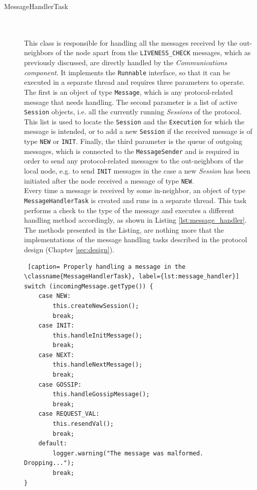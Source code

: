 \documentclass[a4paper,11pt,twoside]{report}
\newcommand{\classname}[1]{\texttt{#1}}
\begin{document}
\begin{description}
\item[MessageHandlerTask] \hfill \\\\
This class is responsible for handling all the messages received by the out-neighbors of the node  apart from the \classname{LIVENESS\_CHECK} messages, which as previously discussed, are directly handled by the \textit{Communications component}. It implements the \classname{Runnable} interface, so that it can be executed in a separate thread and requires three parameters to operate. The first is an object of type \classname{Message}, which is any protocol-related message that needs handling. The second parameter is a list of active \classname{Session} objects, i.e. all the currently running \textit{Sessions} of the protocol. This list is used to locate the \classname{Session} and the \classname{Execution} for which the message is intended, or to add a new \classname{Session} if the received message is of type \classname{NEW} or \classname{INIT}. Finally, the third parameter is the queue of outgoing messages, which is connected to the \classname{MessageSender} and is required in order to send any protocol-related messages to the out-neighbors of the local node, e.g. to send \classname{INIT} messages in the case a new \textit{Session} has been initiated after the node received a message of type \classname{NEW}.\\

Every time a message is received by some in-neighbor, an object of type \classname{MessageHandlerTask} is created and runs in a separate thread. This task performs a check to the type of the message and executes a different handling method accordingly, as shown in Listing \ref{lst:message_handler}. The methods presented in the Listing, are nothing more that the implementations of the message handling tasks described in the protocol design (Chapter \ref{sec:design}). \\

\begin{lstlisting} [caption= Properly handling a message in the \classname{MessageHandlerTask}, label={lst:message_handler}]
switch (incomingMessage.getType()) {
	case NEW:
		this.createNewSession();
		break;
	case INIT:
		this.handleInitMessage();
		break;
	case NEXT:
		this.handleNextMessage();
		break;
	case GOSSIP:
		this.handleGossipMessage();
		break;
	case REQUEST_VAL:
		this.resendVal();
		break;
	default:
		logger.warning("The message was malformed. Dropping...");
		break;
}
\end{lstlisting}




\end{description}
\end{document}
